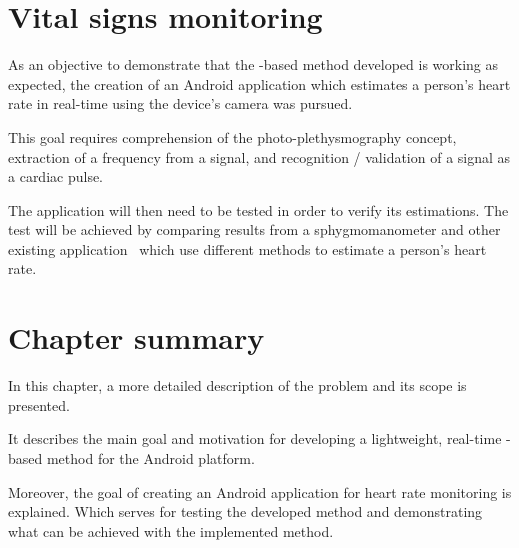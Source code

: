 \section{Vital signs monitoring} \label{sec:problem:heart}

As an objective to demonstrate that the \evm{}-based method developed is
working as expected, the creation of an Android application which
estimates a person's heart rate in real-time using the device's camera was
pursued.

This goal requires comprehension of the photo-plethysmography concept,
extraction of a frequency from a signal, and recognition / validation of a
signal as a cardiac pulse.

The application will then need to be tested in order to verify its estimations.
The test will be achieved by comparing results from a sphygmomanometer and
other existing application~\cite{Vitrox2013, Philips2013} which use different
methods to estimate a person's heart rate.

\section{Chapter summary}

In this chapter, a more detailed description of the problem and its scope is
presented.

It describes the main goal and motivation for developing a lightweight,
real-time \evm{}-based method for the Android platform.

Moreover, the goal of creating an Android application for heart rate monitoring
is explained. Which serves for testing the developed method and demonstrating
what can be achieved with the implemented \evm{} method.
